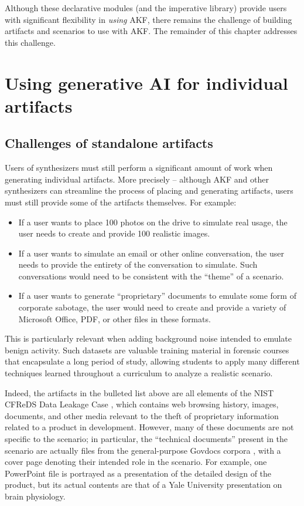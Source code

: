 \documentclass[letterpaper,12pt]{report}
\def\tightlist{}
\begin{document}
Although these declarative modules (and the imperative library) provide
users with significant flexibility in \emph{using} AKF, there remains
the challenge of building artifacts and scenarios to use with AKF. The
remainder of this chapter addresses this challenge.

\section{Using generative AI for individual
artifacts}\label{using-generative-ai-for-individual-artifacts}

\subsection{Challenges of standalone
artifacts}\label{challenges-of-standalone-artifacts}

Users of synthesizers must still perform a significant amount of work
when generating individual artifacts. More precisely -- although AKF and
other synthesizers can streamline the process of placing and generating
artifacts, users must still provide some of the artifacts themselves.
For example:

\begin{itemize}
\tightlist
\item
  If a user wants to place 100 photos on the drive to simulate real
  usage, the user needs to create and provide 100 realistic images.
\item
  If a user wants to simulate an email or other online conversation, the
  user needs to provide the entirety of the conversation to simulate.
  Such conversations would need to be consistent with the ``theme'' of a
  scenario.
\item
  If a user wants to generate ``proprietary'' documents to emulate some
  form of corporate sabotage, the user would need to create and provide
  a variety of Microsoft Office, PDF, or other files in these formats.
\end{itemize}

This is particularly relevant when adding background noise intended to
emulate benign activity. Such datasets are valuable training material in
forensic courses that encapsulate a long period of study, allowing
students to apply many different techniques learned throughout a
curriculum to analyze a realistic scenario.

Indeed, the artifacts in the bulleted list above are all elements of the
NIST CFReDS Data Leakage Case
\cite{nationalinstituteofstandardsandtechnologyCFReDSDataLeakage},
which contains web browsing history, images, documents, and other media
relevant to the theft of proprietary information related to a product in
development. However, many of these documents are not specific to the
scenario; in particular, the ``technical documents'' present in the
scenario are actually files from the general-purpose Govdocs corpora
\cite{garfinkelBringingScienceDigital2009}, with a cover page
denoting their intended role in the scenario. For example, one
PowerPoint file is portrayed as a presentation of the detailed design of
the product, but its actual contents are that of a Yale University
presentation on brain physiology.
\end{document}
